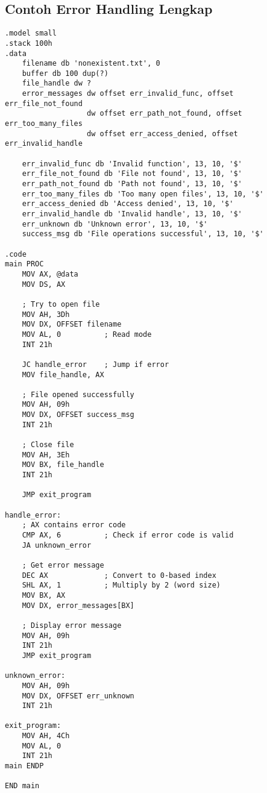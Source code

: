 \documentclass[../main.tex]{subfiles}
\begin{document}
        \subsection{Contoh Error Handling Lengkap}
            \begin{lstlisting}[language={[x86masm]Assembler}, caption=Program Error Handling Lengkap, label={lst:error-handling}]
.model small
.stack 100h
.data
    filename db 'nonexistent.txt', 0
    buffer db 100 dup(?)
    file_handle dw ?
    error_messages dw offset err_invalid_func, offset err_file_not_found
                   dw offset err_path_not_found, offset err_too_many_files
                   dw offset err_access_denied, offset err_invalid_handle
    
    err_invalid_func db 'Invalid function', 13, 10, '$'
    err_file_not_found db 'File not found', 13, 10, '$'
    err_path_not_found db 'Path not found', 13, 10, '$'
    err_too_many_files db 'Too many open files', 13, 10, '$'
    err_access_denied db 'Access denied', 13, 10, '$'
    err_invalid_handle db 'Invalid handle', 13, 10, '$'
    err_unknown db 'Unknown error', 13, 10, '$'
    success_msg db 'File operations successful', 13, 10, '$'

.code
main PROC
    MOV AX, @data
    MOV DS, AX
    
    ; Try to open file
    MOV AH, 3Dh
    MOV DX, OFFSET filename
    MOV AL, 0          ; Read mode
    INT 21h
    
    JC handle_error    ; Jump if error
    MOV file_handle, AX
    
    ; File opened successfully
    MOV AH, 09h
    MOV DX, OFFSET success_msg
    INT 21h
    
    ; Close file
    MOV AH, 3Eh
    MOV BX, file_handle
    INT 21h
    
    JMP exit_program
    
handle_error:
    ; AX contains error code
    CMP AX, 6          ; Check if error code is valid
    JA unknown_error
    
    ; Get error message
    DEC AX             ; Convert to 0-based index
    SHL AX, 1          ; Multiply by 2 (word size)
    MOV BX, AX
    MOV DX, error_messages[BX]
    
    ; Display error message
    MOV AH, 09h
    INT 21h
    JMP exit_program
    
unknown_error:
    MOV AH, 09h
    MOV DX, OFFSET err_unknown
    INT 21h
    
exit_program:
    MOV AH, 4Ch
    MOV AL, 0
    INT 21h
main ENDP

END main
            \end{lstlisting}
\end{document}

